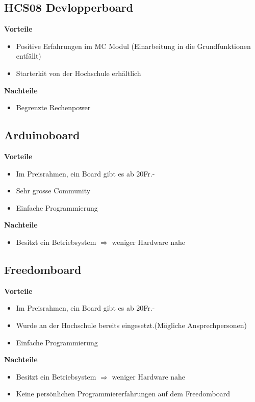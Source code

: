 \subsection{HCS08 Devlopperboard}
\textbf {Vorteile}
\begin{itemize}
\item Positive Erfahrungen im MC Modul (Einarbeitung in die Grundfunktionen entfällt)
\item Starterkit von der Hochschule erhältlich \\
\end{itemize}
\textbf {Nachteile}
\begin{itemize}
\item Begrenzte Rechenpower
\end{itemize}

\subsection{Arduinoboard}
\textbf {Vorteile}
\begin{itemize}
\item Im Preisrahmen, ein Board gibt es ab 20Fr.-
\item Sehr grosse Community
\item Einfache Programmierung\\
\end{itemize}
\textbf {Nachteile}
\begin{itemize}
\item Besitzt ein Betriebsystem $\Rightarrow$ weniger Hardware nahe
\end{itemize}

\subsection{Freedomboard}
\textbf {Vorteile}
\begin{itemize}
\item Im Preisrahmen, ein Board gibt es ab 20Fr.-
\item Wurde an der Hochschule bereits eingesetzt.(Mögliche Ansprechpersonen)
\item Einfache Programmierung\\
\end{itemize}
\textbf {Nachteile}
\begin{itemize}
\item Besitzt ein Betriebsystem $\Rightarrow$ weniger Hardware nahe
\item Keine persönlichen Programmiererfahrungen auf dem Freedomboard
\end{itemize}

